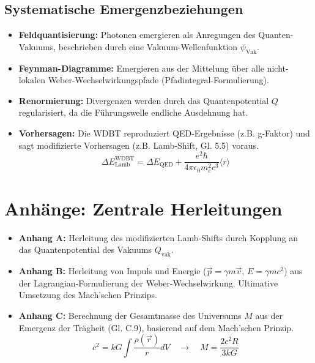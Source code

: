 \documentclass[10pt,a4paper]{article}
\begin{document}
\subsection*{Systematische Emergenzbeziehungen}
\begin{itemize}
    \item \textbf{Feldquantisierung:} Photonen emergieren als Anregungen des Quanten-Vakuums, beschrieben durch eine Vakuum-Wellenfunktion $\psi_{\text{Vak}}$.
    \item \textbf{Feynman-Diagramme:} Emergieren aus der Mittelung über alle nicht-lokalen Weber-Wechselwirkungspfade (Pfadintegral-Formulierung).
    \item \textbf{Renormierung:} Divergenzen werden durch das Quantenpotential $Q$ regularisiert, da die Führungswelle endliche Ausdehnung hat.
    \item \textbf{Vorhersagen:} Die WDBT reproduziert QED-Ergebnisse (z.B. g-Faktor) und sagt modifizierte Vorhersagen (z.B. Lamb-Shift, Gl. 5.5) voraus.
        \[
        \Delta E^{\text{WDBT}}_{\text{Lamb}} = \Delta E_{\text{QED}} + \frac{e^2 \hbar}{4\pi\epsilon_0 m_e^2 c^3} \langle r \rangle
        \]
\end{itemize}

\section*{Anhänge: Zentrale Herleitungen}
\begin{itemize}
    \item \textbf{Anhang A:} Herleitung des modifizierten Lamb-Shifts durch Kopplung an das Quantenpotential des Vakuums $Q_{\text{vak}}$.
    \item \textbf{Anhang B:} Herleitung von Impuls und Energie ($\vec{p} = \gamma m \vec{v}$, $E = \gamma m c^2$) aus der Lagrangian-Formulierung der Weber-Wechselwirkung. Ultimative Umsetzung des Mach'schen Prinzips.
    \item \textbf{Anhang C:} Berechnung der Gesamtmasse des Universums $M$ aus der Emergenz der Trägheit (Gl. C.9), basierend auf dem Mach'schen Prinzip.
        \[
        c^2 = kG \int \frac{\rho(\vec{r})}{r}  dV \quad \rightarrow \quad M = \frac{2c^2 R}{3kG}
        \]
\end{itemize}
\end{document}
